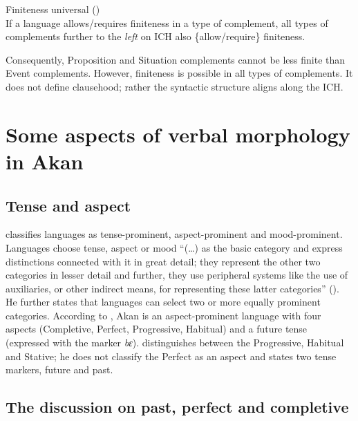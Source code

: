 \documentclass[output=paper]{langscibook}
\begin{document}
\begin{exe}
\ex \label{Paj7} Finiteness universal (\citealt{wurmbrandetal2020}) \\ 
If a language {allows/requires} finiteness in a type of complement, all types of complements further to the \emph{left} on ICH also \{allow/require\} finiteness.
\end{exe}


Consequently, Proposition and Situation complements cannot be less finite than Event complements. However, finiteness is possible in all types of complements. It does not define clausehood; rather the syntactic structure aligns along the ICH.  

\section{Some aspects of verbal morphology in Akan}\label{Pajsect:2}

\subsection{Tense and aspect}\largerpage

\citet[92]{bhat1999} classifies languages as tense-prominent, aspect-prominent and mood-prominent. Languages choose tense, aspect or mood “(…) as the basic category and express distinctions connected with it in great detail; they represent the other two categories in lesser detail and further, they use peripheral systems like the use of auxiliaries, or other indirect means, for representing these latter categories” (\citealt[91]{bhat1999}). He further states that languages can select two or more equally prominent categories. According to \citet{osam2008}, Akan is an aspect-prominent language with four aspects (Completive, Perfect, Progressive, Habitual) and a future tense (expressed with the marker \emph{bɛ}). \citet{boadi2008} distinguishes between the Progressive, Habitual and Stative; he does not classify the Perfect as an aspect and states two tense markers, future and past.

\subsection{The discussion on past, perfect and completive}
\end{document}
